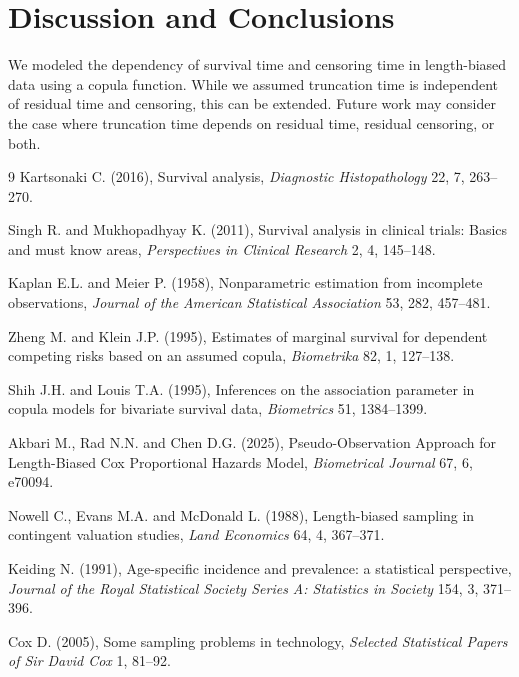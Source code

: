 \documentclass[twoside]{article}
\begin{document}
\section*{Discussion and Conclusions}   
We modeled the dependency of survival time and censoring time in length-biased data using a copula function. While we assumed truncation time is independent of residual time and censoring, this can be extended. Future work may consider the case where  truncation time depends on residual time, residual censoring, or both.
\begin{thebibliography}{9}
Kartsonaki C. (2016), Survival analysis, {\it Diagnostic Histopathology} 22, 7, 263--270.

Singh R. and Mukhopadhyay K. (2011), Survival analysis in clinical trials: Basics and must know areas, {\it Perspectives in Clinical Research} 2, 4, 145--148.

Kaplan E.L. and Meier P. (1958), Nonparametric estimation from incomplete observations, {\it Journal of the American Statistical Association} 53, 282, 457--481.

Zheng M. and Klein J.P. (1995), Estimates of marginal survival for dependent competing risks based on an assumed copula, {\it Biometrika} 82, 1, 127--138.

Shih J.H. and Louis T.A. (1995), Inferences on the association parameter in copula models for bivariate survival data, {\it Biometrics} 51, 1384--1399.

Akbari M., Rad N.N. and Chen D.G. (2025), Pseudo-Observation Approach for Length-Biased Cox Proportional Hazards Model, {\it Biometrical Journal} 67, 6, e70094.

Nowell C., Evans M.A. and McDonald L. (1988), Length-biased sampling in contingent valuation studies, {\it Land Economics} 64, 4, 367--371.
   
Keiding N. (1991), Age-specific incidence and prevalence: a statistical perspective, {\it Journal of the Royal Statistical Society Series A: Statistics in Society} 154, 3, 371--396.
   
Cox D. (2005), Some sampling problems in technology, {\it Selected Statistical Papers of Sir David Cox} 1, 81--92.
   

\end{thebibliography}
\end{document}
